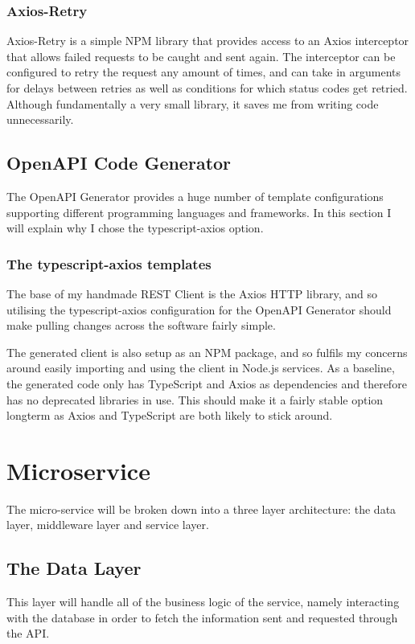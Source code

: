\subsubsection{Axios-Retry}
Axios-Retry is a simple NPM library that provides access to an Axios interceptor that allows failed requests to be caught and sent again. The interceptor can be configured to retry the request any amount of times, and can take in arguments for delays between retries as well as conditions for which status codes get retried. Although fundamentally a very small library, it saves me from writing code unnecessarily. 

\subsection{OpenAPI Code Generator}
The OpenAPI Generator provides a huge number of template configurations supporting different programming languages and frameworks. In this section I will explain why I chose the typescript-axios option.
\subsubsection{The typescript-axios templates}
The base of my handmade REST Client is the Axios HTTP library, and so utilising the typescript-axios configuration for the OpenAPI Generator should make pulling changes across the software fairly simple.

The generated client is also setup as an NPM package, and so fulfils my concerns around easily importing and using the client in Node.js services. As a baseline, the generated code only has TypeScript and Axios as dependencies and therefore has no deprecated libraries in use. This should make it a fairly stable option longterm as Axios and TypeScript are both likely to stick around. 
\section{Microservice}
The micro-service will be broken down into a three layer architecture: the data layer, middleware layer and service layer.
\subsection{The Data Layer}
This layer will handle all of the business logic of the service, namely interacting with the database in order to fetch the information sent and requested through the API.
